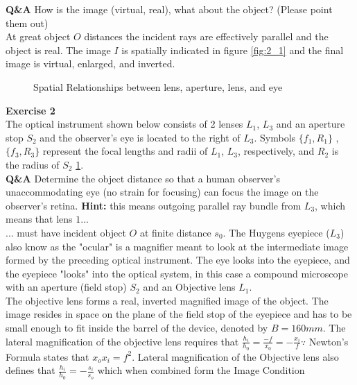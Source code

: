 \documentclass[main.tex]{subfiles}
\begin{document}
\textbf{Q\&A} How is the image (virtual, real), what about the object? (Please point them out)\\

At great object $O$ distances the incident rays are effectively parallel and the object is real. The image $I$ is spatially indicated in figure \ref{fig:2_1} and the final image is virtual, enlarged, and inverted. 


\newpage

\begin{figure}
\centering{}
\caption{Spatial Relationships between lens, aperture, lens, and eye}
\label{fig:2_2}
\end{figure}

\textbf{Exercise 2}\\
The optical instrument shown below consists of 2 lenses $L_1$, $L_3$ and an aperture stop $S_2$ and the observer's eye is located to the right of $L_3$. Symbols $\{f_1 , R_1\}$ , $\{f_3 , R_3\}$ represent the focal lengths and radii of $L_1$, $L_3$, respectively, and $R_2$ is the radius of $S_2$ \ref{fig:2_2}.\\

\textbf{Q\&A} Determine the object distance so that a human observer's unaccommodating eye (no strain for focusing) can focus the image on the observer's retina. \textbf{Hint:} this means outgoing parallel ray bundle from $L_3$, which means that lens $1 ...$\\

... must have incident object $O$ at finite distance $s_0$. The Huygens eyepiece ($L_3$) also know as the "ocular" is a magnifier meant to look at the intermediate image formed by the preceding optical instrument. The eye looks into the eyepiece, and the eyepiece "looks" into the optical system, in this case a compound microscope with an aperture (field stop) $S_2$ and an Objective lens $L_1$.\\

The objective lens forms a real, inverted magnified image of the object. The image resides in space on the plane of the field stop of the eyepiece and has to be small enough to fit inside the barrel of the device, denoted by $B=160mm$. The lateral magnification of the objective lens requires that $\frac{h_i}{h_0} = \frac{-f}{x_0} = -\frac{x_i}{f} \because$ Newton's Formula states that $x_o x_i = f^2$. Lateral magnification of the Objective lens also defines that $\frac{h_i}{h_0} = -\frac{s_i}{s_o}$ which when combined form the Image Condition
\end{document}
